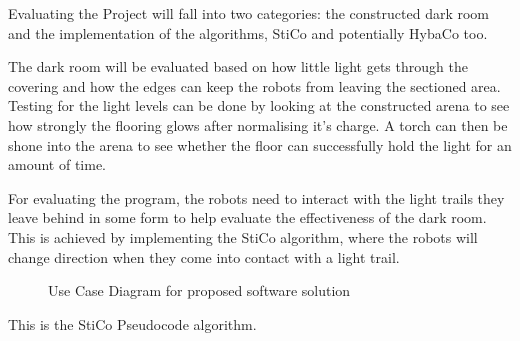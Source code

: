 \label{desSysEval}
Evaluating the Project will fall into two categories:  the constructed dark
room and the implementation of the algorithms, StiCo and potentially HybaCo
too.

The dark room will be evaluated based on how little light gets through the
covering and how the edges can keep the robots from leaving the sectioned area.
Testing for the light levels can be done by looking at the constructed arena to
see how strongly the flooring glows after normalising it's charge.  A torch can
then be shone into the arena to see whether the floor can successfully hold the
light for an amount of time.

For evaluating the program, the robots need to interact with the light trails
they leave behind in some form to help evaluate the effectiveness of the dark 
room.  This is achieved by implementing the StiCo algorithm, where the robots
will change direction when they come into contact with a light trail.



\begin{figure}[h!]
  \label{desUseCase}
  \caption{Use Case Diagram for proposed software solution}
\end{figure}




This is the StiCo Pseudocode algorithm\cite{Ranjbar-Sahraei2012Demo}.

